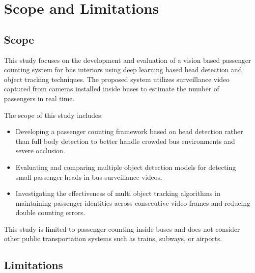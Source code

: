 \documentclass[12pt,a4paper]{report}
\begin{document}
\section{Scope and Limitations}
\subsection{Scope}
This study focuses on the development and evaluation of a vision based passenger counting system for bus interiors using deep learning based head detection and object tracking techniques. The proposed system utilizes surveillance video captured from cameras installed inside buses to estimate the number of passengers in real time.

The scope of this study includes:

\begin{itemize}[itemsep=0pt]

\item Developing a passenger counting framework based on head detection rather than full body detection to better handle crowded bus environments and severe occlusion.

\item Evaluating and comparing multiple object detection models for detecting small passenger heads in bus surveillance videos.

\item Investigating the effectiveness of multi object tracking algorithms in maintaining passenger identities across consecutive video frames and reducing double counting errors.



\end{itemize}

This study is limited to passenger counting inside buses and does not consider other public transportation systems such as trains, subways, or airports.

\subsection{Limitations}
\end{document}
